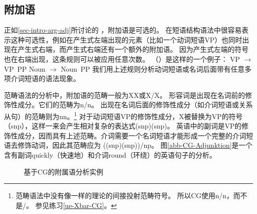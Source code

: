 \subsection{附加语}

正如\ref{sec-intro-arg-adj}所讨论的
，附加语是可选的。
在短语结构语法中很容易表示这种可选性，例如在产生式左端出现的元素（比如一个动词短语VP）也同时出现在产生式右端，而产生式右端还有一个额外的附加语。
因为产生式左端的符号也在右端出现，这条规则可以被应用任意次数。
（）是这样的一个例子：
\eal
\ex VP $\to$ VP~PP
\ex Noun $\to$ Noun~PP
\zl
我们用上述规则分析动词短语或名词后面带有任意多项介词短语的语法现象。

范畴语法的分析中，附加语的范畴一般为X\bs X或X/X。
形容词是出现在名词前的修饰性成分。它们的范畴为n/n。
出现在名词后面的修饰性成分（如介词短语或关系从句）的范畴则为n\bs n。\footnote{%
  范畴语法中没有像\xbarc 一样的\xbarc 理论的间接投射范畴符号。
  所以CG使用n/n，而不是\nbarc/\nbarc。
  参见练习\ref{ue-Xbar-CG}。
} 
对于动词短语VP的修饰性成分，X被替换为VP的符号（s\bs np），这样一来会产生相对复杂的表达式(s\bs np)\bs (s\bs np)。
英语中的副词是VP的修饰性成分，因而具有上述范畴。介词需要一个名词短语才能形成一个完整的介词短语去修饰动词，因此其范畴应为
((s\bs np)\bs (s\bs np))/np。
图\vref{abb-CG-Adjunktion}是一个含有副词quickly（快速地）和介词round（环绕）的英语句子的分析。
%
\begin{figure}
\caption{\label{abb-CG-Adjunktion}基于CG的附属语分析实例}
\end{figure}%
